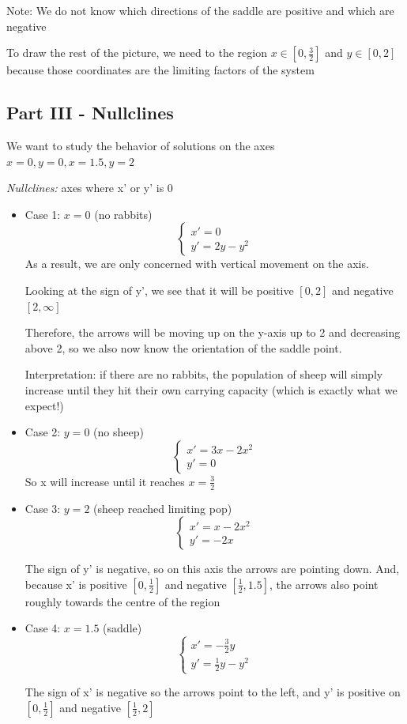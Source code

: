 \documentclass[12pt]{article}
\begin{document}
Note: We do not know which directions of the saddle are positive and which are negative

To draw the rest of the picture, we need to the region $x \in [0, \frac{3}{2}]$ and $y \in [0, 2]$ because those coordinates are the limiting factors of the system 

\subsection*{Part III - Nullclines}
We want to study the behavior of solutions on the axes $x = 0, y = 0, x = 1.5, y = 2$

\emph{Nullclines:} axes where x' or y' is 0

\begin{itemize}
    \item Case 1: $x = 0$ (no rabbits)
        \[\begin{cases}
            x' = 0\\
            y' = 2y - y^2
        \end{cases}\]
        As a result, we are only concerned with vertical movement on the axis.

        Looking at the sign of y', we see that it will be positive $[0, 2]$ and negative $[2, \infty]$

        Therefore, the arrows will be moving up on the y-axis up to 2 and decreasing above 2, so we also now know the orientation of the saddle point.

        Interpretation: if there are no rabbits, the population of sheep will simply increase until they hit their own carrying capacity (which is exactly what we expect!)

    \item Case 2: $y = 0$ (no sheep)
    \[\begin{cases}
        x' = 3x - 2x^2\\
        y' = 0
    \end{cases}\]
    So x will increase until it reaches $x = \frac{3}{2}$

    \item Case 3: $y = 2$ (sheep reached limiting pop)
        \[\begin{cases}
            x' = x - 2x^2\\
            y' = -2x
        \end{cases}\]

        The sign of y' is negative, so on this axis the arrows are pointing down. And, because x' is positive $[0, \frac{1}{2}]$ and negative $[\frac{1}{2}, 1.5]$, the arrows also point roughly towards the centre of the region 

    \item Case 4: $x = 1.5$ (saddle)
        \[\begin{cases}
            x' = - \frac{3}{2}y\\
            y' = \frac{1}{2}y - y^2
        \end{cases}\]

        The sign of x' is negative so the arrows point to the left, and y' is positive on $[0, \frac{1}{2}]$ and negative $[\frac{1}{2}, 2]$
\end{itemize}
\end{document}
